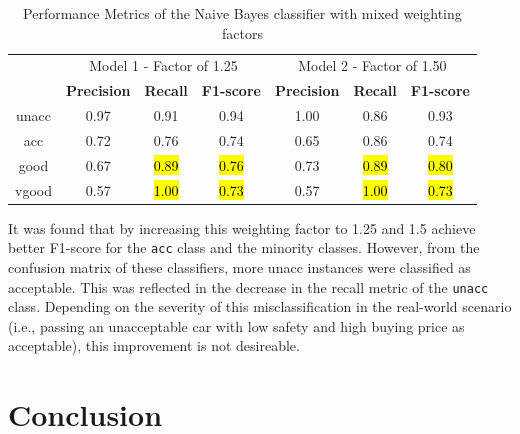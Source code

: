 \documentclass[a4paper]{article}
\begin{document}
\begin{table}[ht]
  \centering
  \caption{Performance Metrics of the Naive Bayes classifier with mixed weighting factors}
  \label{tab:nb_performance_1.25_5_5}
  \begin{tabular}{||c | c c c | c c c||}

  \hline
  \centering
  \multirow{2}{*}{Class}    & \multicolumn{3}{c|}{Model 1 - Factor of 1.25}                     & \multicolumn{3}{c||}{Model 2 - Factor of 1.50} \\\cline{2-7} 
                            & \textbf{Precision}  & \textbf{Recall}   & \textbf{F1-score}       & \textbf{Precision}  & \textbf{Recall}   & \textbf{F1-score}\\
  \hline \hline
  unacc                     & 0.97                & 0.91              & 0.94                    & 1.00                & 0.86              & 0.93\\ \hline
  acc                       & 0.72                & 0.76              & 0.74                    & 0.65                & 0.86              & 0.74\\ \hline
  good                      & 0.67                & \hl{0.89}         & \hl{0.76}               & 0.73                & \hl{0.89}         & \hl{0.80}\\ \hline
  vgood                     & 0.57                & \hl{1.00}         & \hl{0.73}               & 0.57                & \hl{1.00}         & \hl{0.73}\\ \hline
  \end{tabular}
\end{table}


It was found that by increasing this weighting factor to 1.25 and 1.5 achieve better F1-score for the \lstinline{acc} class and the minority classes. However, from the confusion matrix of these classifiers, more unacc instances were classified as acceptable. This was reflected in the decrease in the recall metric of the \lstinline{unacc} class. Depending on the severity of this misclassification in the real-world scenario (i.e., passing an unacceptable car with low safety and high buying price as acceptable), this improvement is not desireable.

\newpage
\section{Conclusion}

\newpage


\end{document}
